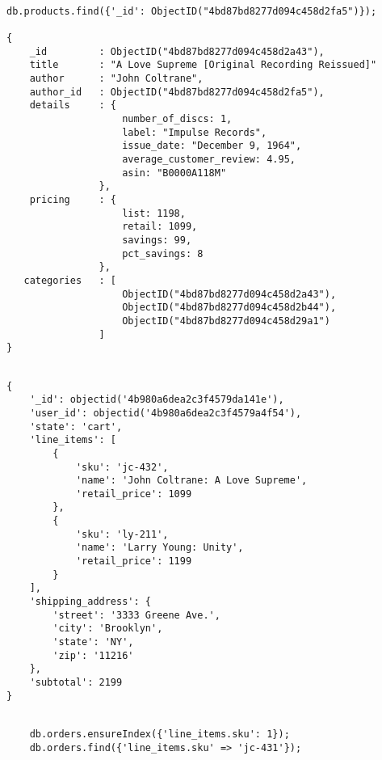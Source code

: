 \chapter{\pseudoSchemaCPT \ecommerceCOM }\label{ap:pseudo_schema_ecommerce}

\medskip
\begin{lstlisting}[caption= Busqueda en MongoDB, label=source:javascript:example_search_mongodb]

db.products.find({'_id': ObjectID("4bd87bd8277d094c458d2fa5")});

{
    _id         : ObjectID("4bd87bd8277d094c458d2a43"),
    title       : "A Love Supreme [Original Recording Reissued]"
    author      : "John Coltrane",
    author_id   : ObjectID("4bd87bd8277d094c458d2fa5"),
    details     : {
                    number_of_discs: 1,
                    label: "Impulse Records",
                    issue_date: "December 9, 1964",
                    average_customer_review: 4.95,
                    asin: "B0000A118M"
                },
    pricing     : {
                    list: 1198,
                    retail: 1099,
                    savings: 99,
                    pct_savings: 8
                },
   categories   : [
                    ObjectID("4bd87bd8277d094c458d2a43"),
                    ObjectID("4bd87bd8277d094c458d2b44"), 
                    ObjectID("4bd87bd8277d094c458d29a1")
                ]
}
\end{lstlisting}


\medskip
\begin{lstlisting}[caption= Estructura de una \orderCommerce., label=source:javascript:example_schema_order]

{
    '_id': objectid('4b980a6dea2c3f4579da141e'),
    'user_id': objectid('4b980a6dea2c3f4579a4f54'),
    'state': 'cart',
    'line_items': [
        {
            'sku': 'jc-432',
            'name': 'John Coltrane: A Love Supreme',
            'retail_price': 1099
        },
        {
            'sku': 'ly-211',
            'name': 'Larry Young: Unity',
            'retail_price': 1199
        }
    ],
    'shipping_address': {
        'street': '3333 Greene Ave.',
        'city': 'Brooklyn',
        'state': 'NY',
        'zip': '11216'
    },
    'subtotal': 2199
}
\end{lstlisting}

\medskip
\begin{lstlisting}[caption= Consulta eficiente con \secIndexesDB., label=source:javascript:example_querying_orders_mongodb]

    db.orders.ensureIndex({'line_items.sku': 1});
    db.orders.find({'line_items.sku' => 'jc-431'});
    
\end{lstlisting}



